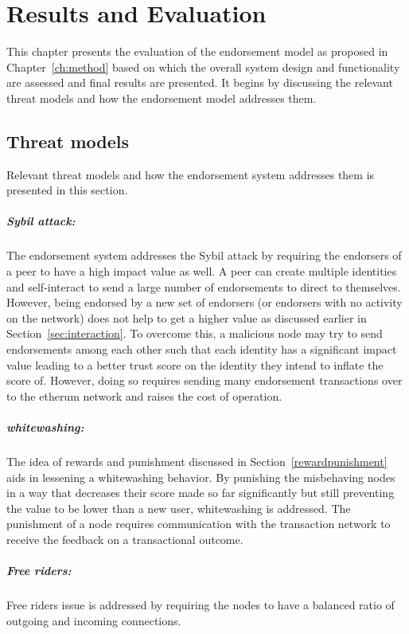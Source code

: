 \chapter{Results and Evaluation} \label{ch:results}
This chapter presents the evaluation of the endorsement model as proposed in
Chapter~\ref{ch:method} based on which the overall system design and
functionality are assessed and final results are presented. It begins by
discussing the relevant threat models and how the endorsement model addresses
them. 

\section{Threat models}\label{sec:threatModel}
Relevant threat models and how the endorsement system addresses them is
presented in this section. 
\paragraph{Sybil attack:} The endorsement system addresses the Sybil attack by
requiring the endorsers of a peer to have a high impact value as well. A peer
can create multiple identities and self-interact to send a large number of
endorsements to direct to themselves. However, being endorsed by a new set of
endorsers (or endorsers with no activity on the network) does not help to get a
higher value as discussed earlier in Section~\ref{sec:interaction}. To overcome
this, a malicious node may try to send endorsements among each other such that
each identity has a significant impact value leading to a better trust score on
the identity they intend to inflate the score of. However, doing so requires
sending many endorsement transactions over to the etherum network and raises
the cost of operation. 
\paragraph{whitewashing:}The idea of rewards and punishment discussed in
Section~\ref{rewardpunishment} aids in lessening a whitewashing behavior. By
punishing the misbehaving nodes in a way that decreases their score made so far
significantly but still preventing the value to be lower than a new user,
whitewashing is addressed. The punishment of a node requires communication with
the transaction network to receive the feedback on a transactional outcome. 
\paragraph{Free riders:} Free riders issue is addressed by requiring the nodes
to have a balanced ratio of outgoing and incoming connections.
